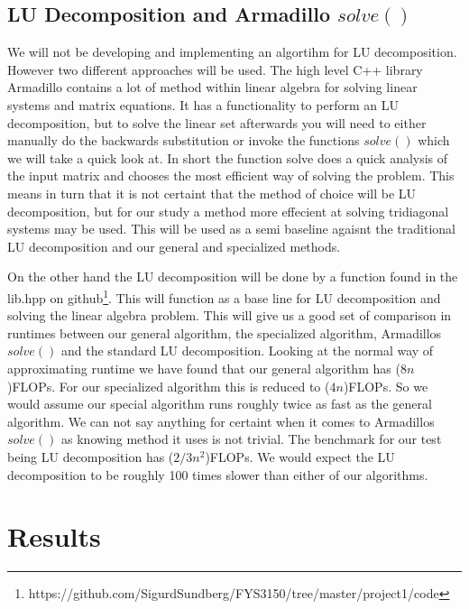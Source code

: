 \documentclass[10pt, a4paper]{amsart}
\begin{document}
\subsection{LU Decomposition and Armadillo $solve()$}
We will not be developing and implementing an algortihm for LU decomposition. However two different approaches will be used. The high level C++ library Armadillo contains a lot of method within linear algebra for solving linear systems and matrix equations. It has a functionality to perform an LU decomposition, but to solve the linear set afterwards you will need to either manually do the backwards substitution or invoke the functions $solve()$ which we will take a quick look at. In short the function solve does a quick analysis of the input matrix and chooses the most efficient way of solving the problem. This means in turn that it is not certaint that the method of choice will be LU decomposition, but for our study a method more effecient at solving tridiagonal systems may be used. This will be used as a semi baseline agaisnt the traditional LU decomposition and our general and specialized methods. 

On the other hand the LU decomposition will be done by a function found in the lib.hpp on github\footnote{https://github.com/SigurdSundberg/FYS3150/tree/master/project1/code}. This will function as a base line for LU decomposition and solving the linear algebra problem. This will give us a good set of comparison in runtimes between our general algorithm, the specialized algorithm, Armadillos $solve()$ and the standard LU decomposition. Looking at the normal way of approximating runtime we have found that our general algorithm has ($8n$)FLOPs. For our specialized algorithm this is reduced to ($4n$)FLOPs. So we would assume our special algorithm runs roughly twice as fast as the general algorithm. We can not say anything for certaint when it comes to Armadillos $solve()$ as knowing method it uses is not trivial. The benchmark for our test being LU decomposition has ($2/3 n^2$)FLOPs\cite{morten}. We would expect the LU decomposition to be roughly 100 times slower than either of our algorithms. 

\section{Results}
\end{document}
